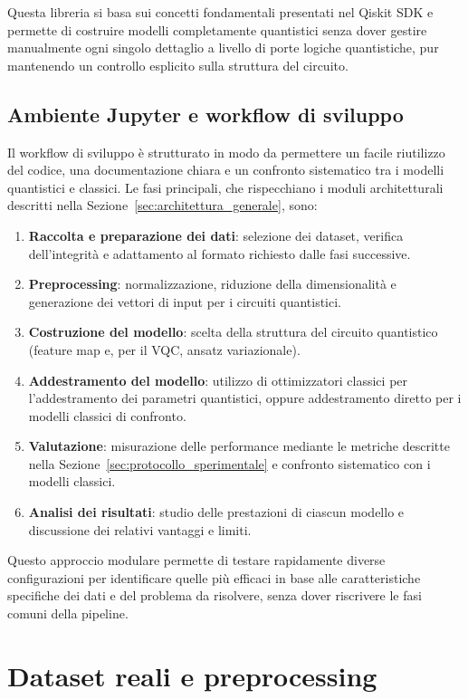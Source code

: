 Questa libreria si basa sui concetti fondamentali presentati nel Qiskit SDK e permette di costruire modelli completamente quantistici senza dover gestire manualmente ogni singolo dettaglio a livello di porte logiche quantistiche, pur mantenendo un controllo esplicito sulla struttura del circuito.

\subsection{Ambiente Jupyter e workflow di sviluppo}
Il workflow di sviluppo è strutturato in modo da permettere un facile riutilizzo del codice, una documentazione chiara e un confronto sistematico tra i modelli quantistici e classici. Le fasi principali, che rispecchiano i moduli architetturali descritti nella Sezione~\ref{sec:architettura_generale}, sono:

\begin{enumerate}
    \item \textbf{Raccolta e preparazione dei dati}: selezione dei dataset, verifica dell'integrità e adattamento al formato richiesto dalle fasi successive.
    \item \textbf{Preprocessing}: normalizzazione, riduzione della dimensionalità e generazione dei vettori di input per i circuiti quantistici.
    \item \textbf{Costruzione del modello}: scelta della struttura del circuito quantistico (feature map e, per il VQC, ansatz variazionale).
    \item \textbf{Addestramento del modello}: utilizzo di ottimizzatori classici per l'addestramento dei parametri quantistici, oppure addestramento diretto per i modelli classici di confronto.
    \item \textbf{Valutazione}: misurazione delle performance mediante le metriche descritte nella Sezione~\ref{sec:protocollo_sperimentale} e confronto sistematico con i modelli classici.
    \item \textbf{Analisi dei risultati}: studio delle prestazioni di ciascun modello e discussione dei relativi vantaggi e limiti.
\end{enumerate}

Questo approccio modulare permette di testare rapidamente diverse configurazioni per identificare quelle più efficaci in base alle caratteristiche specifiche dei dati e del problema da risolvere, senza dover riscrivere le fasi comuni della pipeline.

\section{Dataset reali e preprocessing}
\label{sec:dataset_preprocessing}


